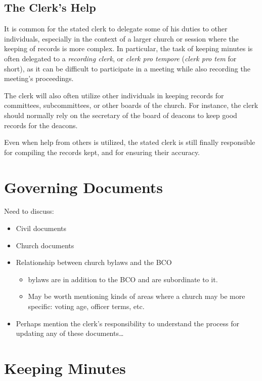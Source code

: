 \documentclass[
]{book}
\providecommand{\tightlist}{%
  \setlength{\itemsep}{0pt}\setlength{\parskip}{0pt}}
\begin{document}
\hypertarget{the-clerks-help}{%
\section{The Clerk's Help}\label{the-clerks-help}}

It is common for the stated clerk to delegate some of his duties to other individuals, especially in the context of a larger church or session where the keeping of records is more complex. In particular, the task of keeping minutes is often delegated to a \emph{recording clerk}, or \emph{clerk pro tempore} (\emph{clerk pro tem} for short), as it can be difficult to participate in a meeting while also recording the meeting's proceedings.

The clerk will also often utilize other individuals in keeping records for committees, subcommittees, or other boards of the church. For instance, the clerk should normally rely on the secretary of the board of deacons to keep good records for the deacons.

Even when help from others is utilized, the stated clerk is still finally responsible for compiling the records kept, and for ensuring their accuracy.

\hypertarget{governing-documents}{%
\chapter{Governing Documents}\label{governing-documents}}

Need to discuss:

\begin{itemize}
\tightlist
\item
  Civil documents
\item
  Church documents
\item
  Relationship between church bylaws and the BCO

  \begin{itemize}
  \tightlist
  \item
    bylaws are in addition to the BCO and are subordinate to it.
  \item
    May be worth mentioning kinds of areas where a church may be more specific: voting age, officer terms, etc.
  \end{itemize}
\item
  Perhaps mention the clerk's responsibility to understand the process for updating any of these documents\ldots{}
\end{itemize}

\hypertarget{keeping-minutes}{%
\chapter{Keeping Minutes}\label{keeping-minutes}}
\end{document}
